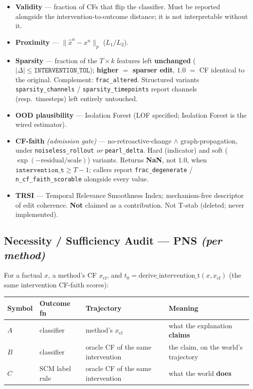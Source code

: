 \documentclass[11pt]{article}
\begin{document}
\begin{itemize}[leftmargin=*]
  \item \textbf{Validity} --- fraction of CFs that flip the classifier.
        Must be reported alongside the intervention-to-outcome distance;
        it is not interpretable without it.
  \item \textbf{Proximity} --- $\lVert \hat{x}^{n} - x^{n} \rVert_{p}$
        ($L_1 / L_2$).
  \item \textbf{Sparsity} --- fraction of the $T \times k$ features left
        \textbf{unchanged} ($\lvert\Delta\rvert \le
        \texttt{INTERVENTION\_TOL}$); \textbf{higher $=$ sparser edit},
        $1.0$ $=$ CF identical to the original. Complement:
        \texttt{frac\_altered}. Structured variants
        \texttt{sparsity\_channels} / \texttt{sparsity\_timepoints}
        report channels (resp.\ timesteps) left entirely untouched.
  \item \textbf{OOD plausibility} --- Isolation Forest (LOF specified;
        Isolation Forest is the wired estimator).
  \item \textbf{CF-faith} \emph{(admission gate)} ---
        no-retroactive-change $\wedge$ graph-propagation, under
        \texttt{noiseless\_rollout} \emph{or} \texttt{pearl\_delta}.
        Hard (indicator) and soft ($\exp(-\mathrm{residual}/\mathrm{scale})$)
        variants. Returns \textbf{NaN}, not $1.0$, when
        $\texttt{intervention\_t} \ge T-1$; callers report
        \texttt{frac\_degenerate} / \texttt{n\_cf\_faith\_scorable}
        alongside every value.
  \item \textbf{TRSI} --- Temporal Relevance Smoothness Index;
        mechanism-free descriptor of edit coherence. \textbf{Not} claimed
        as a contribution. Not T-stab (deleted; never implemented).
\end{itemize}

\subsection{Necessity / Sufficiency Audit --- PNS \emph{(per method)}}

For a factual $x$, a method's CF $x_{\mathrm{cf}}$, and
$t_0 = \mathrm{derive\_intervention\_t}(x, x_{\mathrm{cf}})$
(the same intervention CF-faith scores):

\begin{center}
\begin{tabular}{@{}llll@{}}
  \toprule
  \textbf{Symbol} & \textbf{Outcome fn} & \textbf{Trajectory} & \textbf{Meaning} \\
  \midrule
  $A$ & classifier & method's $x_{\mathrm{cf}}$ & what the explanation \textbf{claims} \\
  $B$ & classifier & oracle CF of the same intervention & the claim, on the world's trajectory \\
  $C$ & SCM label rule & oracle CF of the same intervention & what the world \textbf{does} \\
  \bottomrule
\end{tabular}
\end{center}
\end{document}
